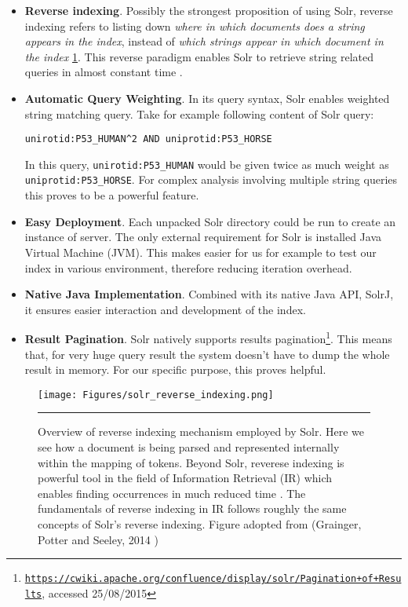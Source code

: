 \begin{itemize}
\item \textbf{Reverse indexing}. Possibly the strongest proposition of using Solr, reverse indexing refers to listing down \textit{where in which documents does a string appears in the index}, instead of \textit{which strings appear in which document in the index} \ref{fig:SolrReverseIndexing}. This reverse paradigm enables Solr to retrieve string related queries in almost constant time \citep{grainger2014solr}.
\item \textbf{Automatic Query Weighting}. In its query syntax, Solr enables weighted string matching query. Take for example following content of Solr query: 
\begin{center}
\texttt{unirotid:P53\_HUMAN\textasciicircum2 AND uniprotid:P53\_HORSE}
\end{center}
In this query, \texttt{unirotid:P53\_HUMAN} would be given twice as much weight as \texttt{uniprotid:P53\_HORSE}. For complex analysis involving multiple string queries this proves to be a powerful feature.
\item \textbf{Easy Deployment}. Each unpacked Solr directory could be run to create an instance of server. The only external requirement for Solr is installed Java Virtual Machine (JVM). This makes easier for us for example to test our index in various environment, therefore reducing iteration overhead.
\item \textbf{Native Java Implementation}. Combined with its native Java API, SolrJ, it ensures easier interaction and development of the index.
\item \textbf{Result Pagination}. Solr natively supports results pagination\footnote{\href{https://cwiki.apache.org/confluence/display/solr/Pagination+of+Results}{\texttt{https://cwiki.apache.org/confluence/display/solr/Pagination+of+Results}}, accessed 25/08/2015}. This means that, for very huge query result the system doesn't have to dump the whole result in memory. For our specific purpose, this proves helpful.
\end{itemize}

\begin{figure}[htbp]
    \texttt{[image: Figures/solr\_reverse\_indexing.png]}
    \rule{35em}{0.5pt}
  \caption[The key data structure supporting information retrieval is the inverted index within Solr system.]{Overview of reverse indexing mechanism employed by Solr. Here we see how a document is being parsed and represented internally within the mapping of tokens. Beyond Solr, reverese indexing is powerful tool in the field of Information Retrieval (IR) which enables finding occurrences in much reduced time \citep{manning2008introduction}. The fundamentals of reverse indexing in IR follows roughly the same concepts of Solr's reverse indexing. Figure adopted from (Grainger, Potter and Seeley, 2014 \citep{grainger2014solr})}
  \label{fig:SolrReverseIndexing}
\end{figure}

